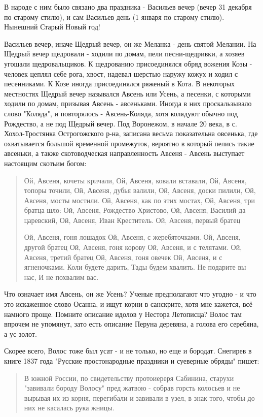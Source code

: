 \documentclass[a5paper,11pt,openany]{article}
\begin{document}
   В народе с ним было связано два праздника - Васильев вечер (вечер 31 декабря по старому стилю), и сам Васильев день (1 января по старому стилю). Нынешний Старый Новый год!

   Васильев вечер, иначе Щедрый вечер, он же Меланка - день святой Мелании. На Щедрый вечер щедровали - ходили по домам, пели песни-щедривки, а хозяев угощали щедровальщиков. К щедрованию присоединялся обряд вожения Козы - человек цеплял себе рога, хвост, надевал шерстью наружу кожух и ходил с песенниками. К Козе иногда присоединялся ряженый в Кота. В некоторых местностях Щедрый вечер назывался Авсень или Усень, а песенки, с которыми ходили по домам, призывая Авсень - авсеньками. Иногда в них проскальзывало слово "Коляда", и повторялось - Авсень-Коляда, хотя колядуют обычно под Рождество, а не под Щедрый вечер. Под Воронежом, в начале 20 века, в с. Хохол-Тростянка Острогожского р-на, записана весьма показательна овсенька, где охватывается большой временной промежуток, вероятно в который пелись такие авсеньки, а также скотоводческая направленность Авсеня - Авсень выступает настоящим скотьим богом:

\begin{quotation}
\noindent Ой, Авсеня, кочеты кричали, Ой, Авсеня, ковали вставали, Ой, Авсеня, топоры точили, Ой, Авсеня, дубья валили, Ой, Авсеня, доски пилили, Ой, Авсеня, мосты мостили. Ой, Авсеня, как по этих мостах, Ой, Авсеня, три братца шло: Ой, Авсеня, Рождество Христово, Ой, Авсеня, Василий да царевский, Ой, Авсеня, Иван Креститель. Ой, Авсеня, первый братец

Ой, Авсеня, гоня лошадок Ой, Авсеня, с жеребяточками. Ой, Авсеня, другой братец Ой, Авсеня, гоня корову Ой, Авсеня, и с телятами. Ой, Авсеня, третий братец Ой, Авсеня, гоня овечек Ой, Авсеня, и с ягненочками. Коли будете дарить, Тады будем хвалить. Не подарите вы нас, И не похвалим вас.
\end{quotation}

   Что означает имя Авсень, он же Усень? Ученые предполагают что угодно - и что это искаженное слово Осанна, и ищут корни в санскрите, хотя мне кажется, всё намного проще. Помните описание идолов у Нестора Летописца? Волос там впрочем не упомянут, зато есть описание Перуна деревяна, а голова его серебяна, а ус золот.

   Скорее всего, Волос тоже был усат - и не только, но еще и бородат. Снегирев в книге 1837 года "Русские простонародные праздники и суеверные обряды" пишет:

\begin{quotation}
\noindent В южной России, по свидетельству протоиереря Сабинина, старухи "завивали бороду Волосу" пред жатвою - собрав горсть колосьев и не вырывая их из корня, перегибали и завивали в узел, в знак того, чтобы до них не касалась рука жницы.
\end{quotation}
\end{document}
